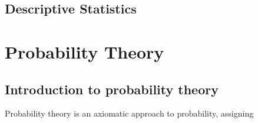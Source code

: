 \documentclass[letterpaper,10pt,english]{jupyterBook}
\begin{document}
\chapter{Descriptive Statistics}
\label{\detokenize{ch/intro/descriptive:descriptive-statistics}}\label{\detokenize{ch/intro/descriptive:intro-descriptive}}\label{\detokenize{ch/intro/descriptive::doc}}
\sphinxstepscope


\part{Probability Theory}

\sphinxstepscope


\chapter{Introduction to probability theory}
\label{\detokenize{ch/prob/intro:introduction-to-probability-theory}}\label{\detokenize{ch/prob/intro:prob-intro}}\label{\detokenize{ch/prob/intro::doc}}
\sphinxAtStartPar
Probability theory is an axiomatic approach to probability, assigning
\end{document}
